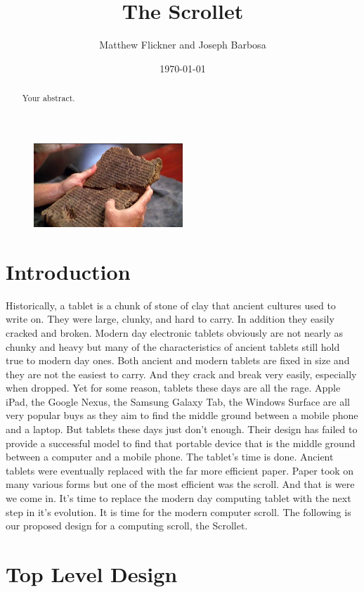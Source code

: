 \documentclass[a4paper]{article}
\title{The Scrollet}
\author{Matthew Flickner and Joseph Barbosa}
\date{\today}
\begin{document}
\maketitle

\begin{abstract}
Your abstract.
\end{abstract}

\begin{figure}[H]
\centering
\includegraphics[width=0.5\textwidth]{ancienttablet.jpg}
\end{figure}

\section{Introduction}
Historically, a tablet is a chunk of stone of clay that ancient cultures used to write on. They were large, clunky, and hard to carry. In addition they easily cracked and broken. Modern day electronic tablets obviously are not nearly as chunky and heavy but many of the characteristics of ancient tablets still hold true to modern day ones. Both ancient and modern tablets are fixed in size and they are not the easiest to carry. And they crack and break very easily, especially when dropped. Yet for some reason, tablets these days are all the rage. Apple iPad, the Google Nexus, the Samsung Galaxy Tab, the Windows Surface are all very popular buys as they aim to find the middle ground between a mobile phone and a laptop. But tablets these days just don't enough. Their design has failed to provide a successful model to find that portable device that is the middle ground between a computer and a mobile phone. The tablet's time is done. Ancient tablets were eventually replaced with the far more efficient paper. Paper took on many various forms but one of the most efficient was the scroll. And that is were we come in. It's time to replace the modern day computing tablet with the next step in it's evolution. It is time for the modern computer scroll. The following is our proposed design for a computing scroll, the Scrollet.


\section{Top Level Design}
\end{document}
